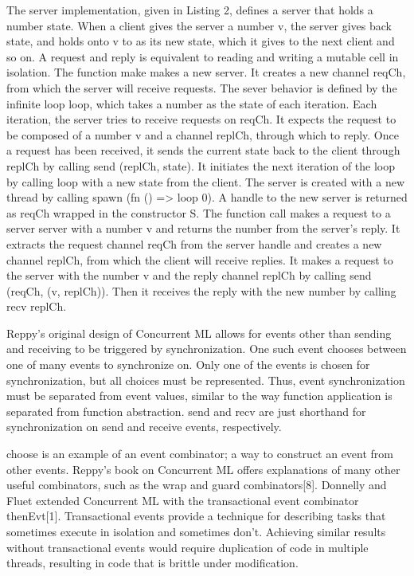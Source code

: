 \documentclass{article}
\begin{document}
The server implementation, given in Listing 2, defines a server that holds a number state.
When a client gives the server a number v, the server gives back state, and holds onto v to as
its new state, which it gives to the next client and so on.  A request and reply is equivalent
to reading and writing a mutable cell in isolation.  The function make makes a new server.  It
creates a new channel reqCh, from which the server will receive requests.  The sever behavior
is defined by the infinite loop loop, which takes a number as the state of each iteration.
Each iteration, the server tries to receive requests on reqCh.  It expects the request to be
composed of a number v and a channel replCh, through which to reply.  Once a request has been
received, it sends the current state back to the client through replCh by calling
send (replCh, state).  It initiates the next iteration of the loop by calling loop with a new
state from the client.  The server is created with a new thread by calling
spawn (fn () => loop 0).   A handle to the new server is returned as reqCh wrapped in the
constructor S.  The function call makes a request to a server server with a number v and
returns the number from the server's reply.  It extracts the request channel reqCh from the
server handle and creates a new channel replCh, from which the client will receive replies.
It makes a request to the server with the number v and the reply channel replCh by calling
send (reqCh, (v, replCh)).  Then it receives the reply with the new number by calling recv
replCh.

Reppy's original design of Concurrent ML allows for events other than sending and receiving to
be triggered by synchronization.  One such event chooses between one of many events to
synchronize on.  Only one of the events is chosen for synchronization, but all choices must be
represented.  Thus, event synchronization must be separated from event values, similar to the
way function application is separated from function abstraction.  send and recv are just
shorthand for synchronization on send and receive events, respectively.


choose is an example of an event combinator; a way to construct an event from other events.
Reppy's book on Concurrent ML offers explanations of many other useful combinators, such as the
wrap and guard combinators[8].  Donnelly and Fluet extended Concurrent ML with the
transactional event combinator thenEvt[1].  Transactional events provide a technique for
describing tasks that sometimes execute in isolation and sometimes don't.  Achieving similar
results without transactional events would require duplication of code in multiple threads,
resulting in code that is brittle under modification.
\end{document}
